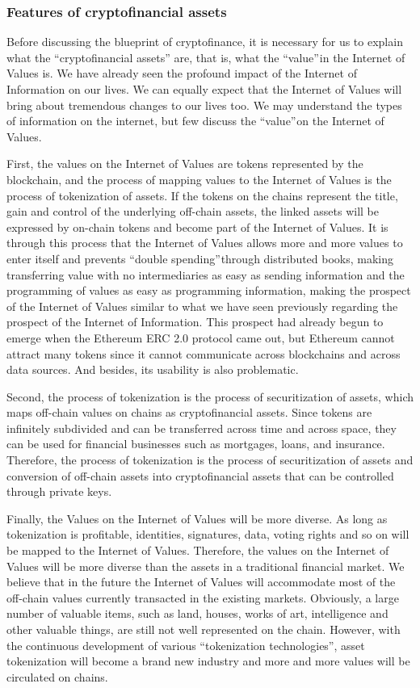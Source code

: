 \documentclass[a4paper,12pt]{article}
\begin{document}
\subsubsection{Features of cryptofinancial assets}

Before discussing the blueprint of cryptofinance, it is necessary for us to explain what the “cryptofinancial assets” are, that is, what the “value” in the Internet of Values is. We have already seen the profound impact of the Internet of Information on our lives. We can equally expect that the Internet of Values will bring about tremendous changes to our lives too. We may understand the types of information on the internet, but few discuss the “value” on the Internet of Values.

First, the values on the Internet of Values are tokens represented by the blockchain, and the process of mapping values to the Internet of Values is the process of tokenization of assets. If the tokens on the chains represent the title, gain and control of the underlying off-chain assets, the linked assets will be expressed by on-chain tokens and become part of the Internet of Values. It is through this process that the Internet of Values allows more and more values to enter itself and prevents “double spending” through distributed books, making transferring value with no intermediaries as easy as sending information and the programming of values as easy as programming information, making the prospect of the Internet of Values similar to what we have seen previously regarding the prospect of the Internet of Information. This prospect had already begun to emerge when the Ethereum ERC 2.0 protocol came out, but Ethereum cannot attract many tokens since it cannot communicate across blockchains and across data sources. And besides, its usability is also problematic.

Second, the process of tokenization is the process of securitization of assets, which maps off-chain values on chains as cryptofinancial assets. Since tokens are infinitely subdivided and can be transferred across time and across space, they can be used for financial businesses such as mortgages, loans, and insurance. Therefore, the process of tokenization is the process of securitization of assets and conversion of off-chain assets into cryptofinancial assets that can be controlled through private keys.

Finally, the Values on the Internet of Values will be more diverse. As long as tokenization is profitable, identities, signatures, data, voting rights and so on will be mapped to the Internet of Values. Therefore, the values on the Internet of Values will be more diverse than the assets in a traditional financial market. We believe that in the future the Internet of Values will accommodate most of the off-chain values currently transacted in the existing markets. Obviously, a large number of valuable items, such as land, houses, works of art, intelligence and other valuable things, are still not well represented on the chain. However, with the continuous development of various “tokenization technologies”, asset tokenization will become a brand new industry and more and more values will be circulated on chains.
\end{document}
